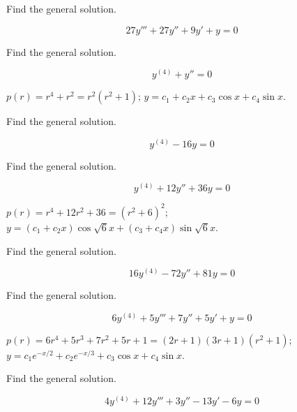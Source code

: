 \documentclass{ximera}
\begin{document}
\begin{problem}\label{exer:9.2.7} Find the general solution.

$$27y'''+27y''+9y'+y=0$$

\end{problem}


\begin{problem}\label{exer:9.2.8} Find the general solution.

$$y^{(4)}+y''=0$$

\begin{solution}
$p(r)=r^4+r^2=r^2(r^2+1)$;
 $y=c_1+c_2x+c_3\cos x+c_4\sin x$.
\end{solution}

\end{problem}

 \begin{problem}\label{exer:9.2.9}  Find the general solution.

$$y^{(4)}-16y=0$$

\end{problem}


\begin{problem}\label{exer:9.2.10} Find the general solution.

$$y^{(4)}+12y''+36y=0$$

\begin{solution}
$p(r)=r^4+12r^2+36=(r^2+6)^2$;
 $y=(c_1+c_2x)\cos\sqrt{6} x+(c_3+c_4x)\sin\sqrt{6} x$.
\end{solution}
\end{problem}



\begin{problem}\label{exer:9.2.11} Find the general solution.

$$16y^{(4)}-72y''+81y=0$$

\end{problem}

\begin{problem}\label{exer:9.2.12} Find the general solution.

$$6y^{(4)}+5y'''+7y''+5y'+y=0$$

\begin{solution}
$p(r)=6r^4+5r^3+7r^2+5r+1=(2r+1)(3r+1)(r^2+1)$;
$y=c_1e^{-x/2}+c_2e^{-x/3}+c_3\cos x+c_4\sin x$.
\end{solution}
\end{problem}


\begin{problem}\label{exer:9.2.13}  Find the general solution.

$$4y^{(4)}+12y'''+3y''-13y'-6y=0$$
\end{problem}
\end{document}
